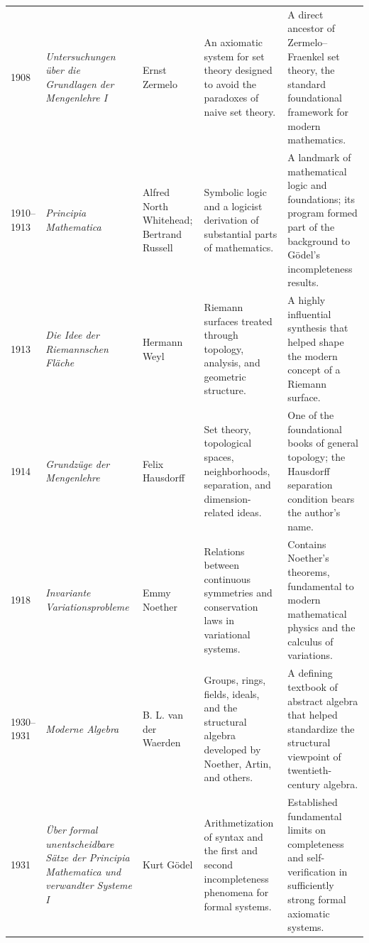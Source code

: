 {\begin{longtable}{@{}L{0.08\textwidth}L{0.21\textwidth}L{0.15\textwidth}L{0.22\textwidth}L{0.26\textwidth}@{}}
        1908
        & \textit{Untersuchungen \"uber die Grundlagen der Mengenlehre I}
        & Ernst Zermelo
        & An axiomatic system for set theory designed to avoid the paradoxes of naive set theory.
        & A direct ancestor of Zermelo--Fraenkel set theory, the standard foundational framework for modern mathematics. \\

        1910--1913
        & \textit{Principia Mathematica}
        & Alfred North Whitehead; Bertrand Russell
        & Symbolic logic and a logicist derivation of substantial parts of mathematics.
        & A landmark of mathematical logic and foundations; its program formed part of the background to G\"odel's incompleteness results. \\

        1913
        & \textit{Die Idee der Riemannschen Fl\"ache}
        & Hermann Weyl
        & Riemann surfaces treated through topology, analysis, and geometric structure.
        & A highly influential synthesis that helped shape the modern concept of a Riemann surface. \\

        1914
        & \textit{Grundz\"uge der Mengenlehre}
        & Felix Hausdorff
        & Set theory, topological spaces, neighborhoods, separation, and dimension-related ideas.
        & One of the foundational books of general topology; the Hausdorff separation condition bears the author's name. \\

        1918
        & \textit{Invariante Variationsprobleme}
        & Emmy Noether
        & Relations between continuous symmetries and conservation laws in variational systems.
        & Contains Noether's theorems, fundamental to modern mathematical physics and the calculus of variations. \\

        1930--1931
        & \textit{Moderne Algebra}
        & B. L. van der Waerden
        & Groups, rings, fields, ideals, and the structural algebra developed by Noether, Artin, and others.
        & A defining textbook of abstract algebra that helped standardize the structural viewpoint of twentieth-century algebra. \\

        1931
        & \textit{\"Uber formal unentscheidbare S\"atze der Principia Mathematica und verwandter Systeme I}
        & Kurt G\"odel
        & Arithmetization of syntax and the first and second incompleteness phenomena for formal systems.
        & Established fundamental limits on completeness and self-verification in sufficiently strong formal axiomatic systems. \\


\end{longtable}}
